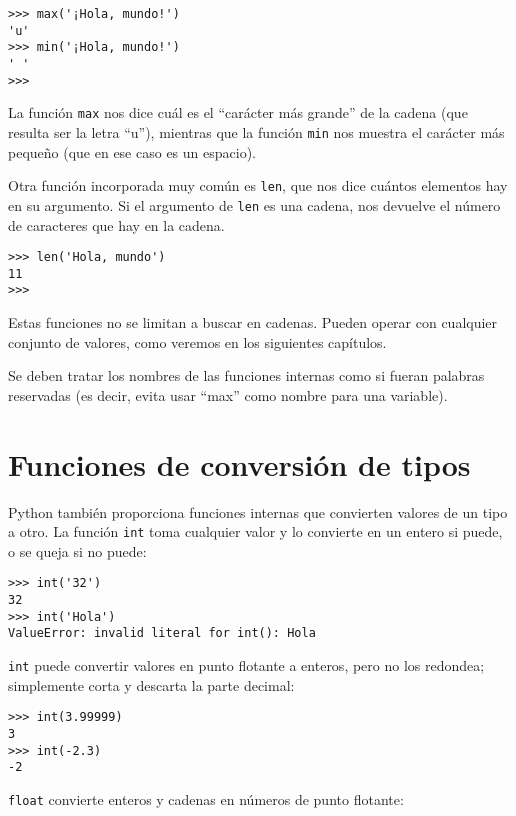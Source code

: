 \beforeverb
\begin{verbatim}
>>> max('¡Hola, mundo!')
'u'
>>> min('¡Hola, mundo!')
' '
>>>
\end{verbatim}
\afterverb
%
La función {\tt max} nos dice cuál es el ``carácter más grande'' de la
cadena (que resulta ser la letra ``u''), mientras que la función
{\tt min} nos muestra el carácter más pequeño (que en ese caso es
un espacio).

Otra función incorporada muy común es {\tt len},
que nos dice cuántos elementos hay en su argumento. Si el argumento
de {\tt len} es una cadena, nos devuelve el número de caracteres
que hay en la cadena.

\beforeverb
\begin{verbatim}
>>> len('Hola, mundo')
11
>>>
\end{verbatim}
\afterverb
%
Estas funciones no se limitan a buscar en cadenas. Pueden operar con
cualquier conjunto de valores, como veremos en los siguientes capítulos.

Se deben tratar los nombres de las funciones internas como si fueran palabras reservadas
(es decir, evita usar ``max'' como nombre para una variable).

\section{Funciones de conversión de tipos}



Python también proporciona funciones internas que convierten valores
de un tipo a otro. La función {\tt int} toma cualquier valor y
lo convierte en un entero si puede, o se queja si no puede:


\beforeverb
\begin{verbatim}
>>> int('32')
32
>>> int('Hola')
ValueError: invalid literal for int(): Hola
\end{verbatim}
\afterverb
%
{\tt int} puede convertir valores en punto flotante a enteros, pero no
los redondea; simplemente corta y descarta la parte decimal:

\beforeverb
\begin{verbatim}
>>> int(3.99999)
3
>>> int(-2.3)
-2
\end{verbatim}
\afterverb
%
{\tt float} convierte enteros y cadenas en números
de punto flotante:


